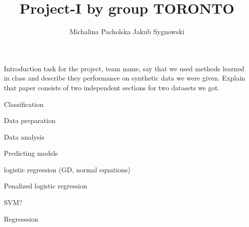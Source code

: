 \documentclass{article}
\title{Project-I by group TORONTO}
\author{Michalina Pacholska \AND Jakub Sygnowski}
\begin{document}
\maketitle
\begin{section}{Introduction}
task for the project, team name, say that we used methods learned in class and describe they performance on synthetic data we were given. Explain that paper consists of two independent sections for two datasets we got.
\end{section}

\begin{section}{Classification}
\begin{subsection}{Data preparation}
\end{subsection}
\begin{subsection}{Data analysis}
\end{subsection}
\begin{subsection}{Predicting models}
\begin{subsubsection}{logistic regression (GD, normal equations)}
\end{subsubsection}
\begin{subsubsection}{Penalized logistic regression}
\end{subsubsection}
\begin{subsubsection}{SVM?}
\end{subsubsection}
\end{subsection}
\end{section}

\begin{section}{Regresssion}
\end{section}
\end{document}

